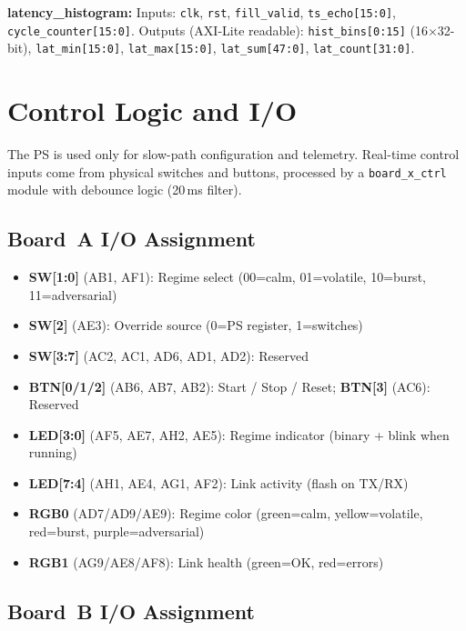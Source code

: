 \documentclass[conference]{IEEEtran}
\begin{document}
\textbf{latency\_histogram:} Inputs: \texttt{clk}, \texttt{rst}, \texttt{fill\_valid}, \texttt{ts\_echo[15:0]}, \texttt{cycle\_counter[15:0]}. Outputs (AXI-Lite readable): \texttt{hist\_bins[0:15]} (16$\times$32-bit), \texttt{lat\_min[15:0]}, \texttt{lat\_max[15:0]}, \texttt{lat\_sum[47:0]}, \texttt{lat\_count[31:0]}.

\section{Control Logic and I/O}

The PS is used only for slow-path configuration and telemetry. Real-time control inputs come from physical switches and buttons, processed by a \texttt{board\_x\_ctrl} module with debounce logic (20\,ms filter).

\subsection{Board~A I/O Assignment}

\begin{itemize}[noitemsep]
  \item \textbf{SW[1:0]} (AB1, AF1): Regime select (00=calm, 01=volatile, 10=burst, 11=adversarial)
  \item \textbf{SW[2]} (AE3): Override source (0=PS register, 1=switches)
  \item \textbf{SW[3:7]} (AC2, AC1, AD6, AD1, AD2): Reserved
  \item \textbf{BTN[0/1/2]} (AB6, AB7, AB2): Start / Stop / Reset; \textbf{BTN[3]} (AC6): Reserved
  \item \textbf{LED[3:0]} (AF5, AE7, AH2, AE5): Regime indicator (binary + blink when running)
  \item \textbf{LED[7:4]} (AH1, AE4, AG1, AF2): Link activity (flash on TX/RX)
  \item \textbf{RGB0} (AD7/AD9/AE9): Regime color (green=calm, yellow=volatile, red=burst, purple=adversarial)
  \item \textbf{RGB1} (AG9/AE8/AF8): Link health (green=OK, red=errors)
\end{itemize}

\subsection{Board~B I/O Assignment}
\end{document}
